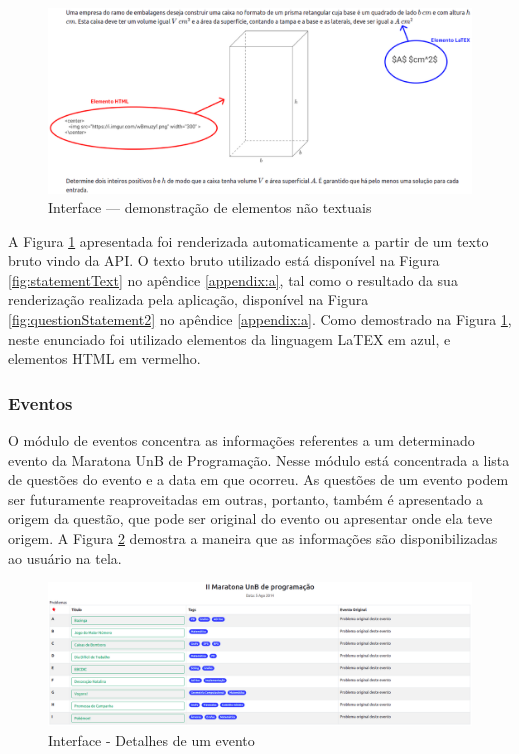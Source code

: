 \begin{figure}[H]
    \centering
    \includegraphics[keepaspectratio=true,scale=0.35]{figuras/questionStatement.eps}
    \caption{Interface — demonstração de elementos não textuais}
    \label{fig:questionStatement}
\end{figure}

A Figura \ref{fig:questionStatement} apresentada foi renderizada automaticamente a partir de um texto bruto vindo da API. O texto bruto utilizado está disponível na Figura \ref{fig:statementText} no apêndice \ref{appendix:a}, tal como o resultado da sua renderização realizada pela aplicação, disponível na Figura \ref{fig:questionStatement2} no apêndice \ref{appendix:a}. Como demostrado na Figura \ref{fig:questionStatement}, neste enunciado foi utilizado elementos da linguagem LaTEX em azul, e elementos HTML em vermelho.

\subsubsection{Eventos}
\label{subsec:eventos}

O módulo de eventos concentra as informações referentes a um determinado evento da Maratona UnB de Programação. Nesse módulo está concentrada a lista de questões do evento e a data em que ocorreu. As questões de um evento podem ser futuramente reaproveitadas em outras, portanto, também é apresentado a origem da questão, que pode ser original do evento ou apresentar onde ela teve origem. A Figura \ref{fig:maratonaUnB} demostra a maneira que as informações são disponibilizadas ao usuário na tela.

\begin{figure}[H]
    \centering
    \includegraphics[keepaspectratio=true,scale=0.23]{figuras/contest2.eps}
    \caption{Interface - Detalhes de um evento}
    \label{fig:maratonaUnB}
\end{figure}


